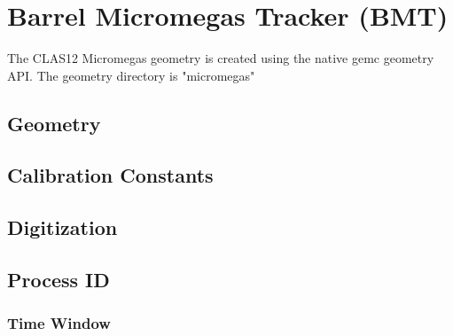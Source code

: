 \section{Barrel Micromegas Tracker (BMT)}

The CLAS12 Micromegas geometry is created using the native gemc geometry API.
The geometry directory is "micromegas"


\subsection{Geometry}

\subsection{Calibration Constants}

\subsection{Digitization}

\subsection{Process ID}

\subsubsection{Time Window}

